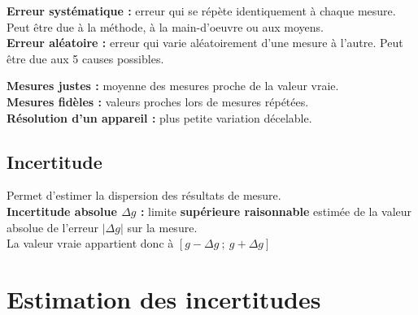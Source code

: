 \documentclass[13pt, twoside, a4paper, french]{report}
\begin{document}
      \begin{minipage}[t]{0.50\textwidth}%
        \textbf{Erreur systématique :} erreur qui se répète identiquement à chaque mesure.
        Peut être due à la méthode, à la main-d'oeuvre ou aux moyens.\\
        
        \textbf{Erreur aléatoire :} erreur qui varie aléatoirement d'une mesure à l'autre.
        Peut être due aux 5 causes possibles.
      \end{minipage}\hspace{0.03\textwidth}
      \begin{minipage}[t]{0.47\textwidth}%
        \textbf{Mesures justes :} moyenne des mesures proche de la valeur vraie.\\
        \textbf{Mesures fidèles :} valeurs proches lors de mesures répétées.\\
        \textbf{Résolution d’un appareil :} plus petite variation décelable.
      \end{minipage}
    
    \subsection{Incertitude}\label{subsec:incertitude}
      
      Permet d’estimer la dispersion des résultats de mesure.\\
      
      \textbf{Incertitude absolue $\Delta g$ :} limite \textbf{supérieure raisonnable} estimée de la valeur absolue de l’erreur $\lvert \Delta g \rvert$ sur la mesure.\\ La valeur vraie appartient donc à $[g - \Delta g\ ;\ g + \Delta g]$
  
  
  \section{Estimation des incertitudes}\label{sec:estimation-des-incertitudes}
    
\end{document}
